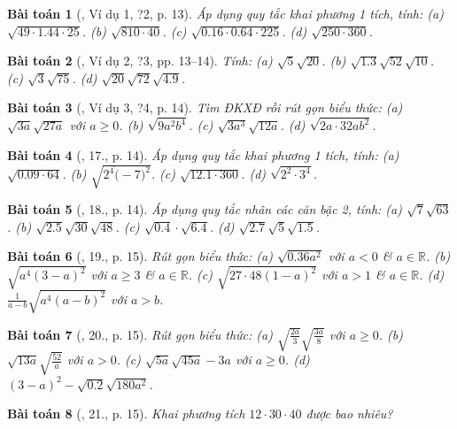 \documentclass{article}
\newtheorem{baitoan}{Bài toán}
\begin{document}
\begin{baitoan}[\cite{SGK_Toan_9_tap_1}, Ví dụ 1, ?2, p. 13]
	Áp dụng quy tắc khai phương 1 tích, tính: (a) $\sqrt{49\cdot1.44\cdot25}$. (b) $\sqrt{810\cdot40}$. (c) $\sqrt{0.16\cdot0.64\cdot225}$. (d) $\sqrt{250\cdot360}$.
\end{baitoan}

\begin{baitoan}[\cite{SGK_Toan_9_tap_1}, Ví dụ 2, ?3, pp. 13--14]
	Tính: (a) $\sqrt{5}\sqrt{20}$. (b) $\sqrt{1.3}\sqrt{52}\sqrt{10}$. (c) $\sqrt{3}\sqrt{75}$. (d) $\sqrt{20}\sqrt{72}\sqrt{4.9}$.
\end{baitoan}

\begin{baitoan}[\cite{SGK_Toan_9_tap_1}, Ví dụ 3, ?4, p. 14]
	Tìm ĐKXĐ rồi rút gọn biểu thức: (a) $\sqrt{3a}\sqrt{27a}$ với $a\ge0$. (b) $\sqrt{9a^2b^4}$. (c) $\sqrt{3a^3}\sqrt{12a}$. (d) $\sqrt{2a\cdot32ab^2}$.
\end{baitoan}

\begin{baitoan}[\cite{SGK_Toan_9_tap_1}, 17., p. 14]
	Áp dụng quy tắc khai phương 1 tích, tính: (a) $\sqrt{0.09\cdot64}$. (b) $\sqrt{2^4\dot(-7)^2}$. (c) $\sqrt{12.1\cdot360}$. (d) $\sqrt{2^2\cdot3^4}$.
\end{baitoan}

\begin{baitoan}[\cite{SGK_Toan_9_tap_1}, 18., p. 14]
	Áp dụng quy tắc nhân các căn bậc 2, tính: (a) $\sqrt{7}\sqrt{63}$. (b) $\sqrt{2.5}\sqrt{30}\sqrt{48}$. (c) $\sqrt{0.4}\cdot\sqrt{6.4}$. (d) $\sqrt{2.7}\sqrt{5}\sqrt{1.5}$.
\end{baitoan}

\begin{baitoan}[\cite{SGK_Toan_9_tap_1}, 19., p. 15]
	Rút gọn biểu thức: (a) $\sqrt{0.36a^2}$ với $a < 0$ \& $a\in\mathbb{R}$. (b) $\sqrt{a^4(3 - a)^2}$ với $a\ge3$ \& $a\in\mathbb{R}$. (c) $\sqrt{27\cdot48(1 - a)^2}$ với $a > 1$ \& $a\in\mathbb{R}$. (d) $\frac{1}{a - b}\sqrt{a^4(a - b)^2}$ với $a > b$.
\end{baitoan}

\begin{baitoan}[\cite{SGK_Toan_9_tap_1}, 20., p. 15]
	Rút gọn biểu thức: (a) $\sqrt{\frac{2a}{3}}\sqrt{\frac{3a}{8}}$ với $a\ge0$. (b) $\sqrt{13a}\sqrt{\frac{52}{a}}$ với $a > 0$. (c) $\sqrt{5a}\sqrt{45a} - 3a$ với $a\ge0$. (d) $(3 - a)^2 - \sqrt{0.2}\sqrt{180a^2}$.
\end{baitoan}

\begin{baitoan}[\cite{SGK_Toan_9_tap_1}, 21., p. 15]
	Khai phương tích $12\cdot30\cdot40$ được bao nhiêu?
\end{baitoan}
\end{document}
